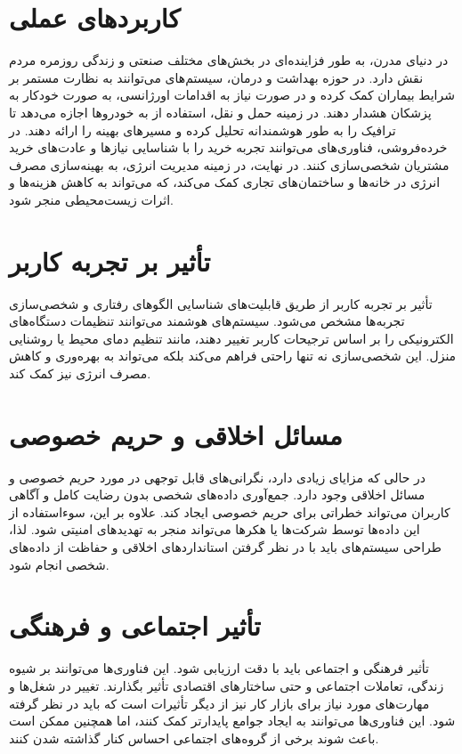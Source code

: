 \section*{کاربردهای عملی }
در دنیای مدرن،
به طور فزاینده‌ای در بخش‌های مختلف صنعتی و زندگی روزمره مردم نقش دارد. در حوزه بهداشت و درمان، سیستم‌های 
می‌توانند به نظارت مستمر بر شرایط بیماران کمک کرده و در صورت نیاز به اقدامات اورژانسی، به صورت خودکار به پزشکان هشدار دهند. در زمینه حمل و نقل، استفاده از
به خودروها اجازه می‌دهد تا ترافیک را به طور هوشمندانه تحلیل کرده و مسیرهای بهینه را ارائه دهند. در خرده‌فروشی، فناوری‌های
می‌توانند تجربه خرید را با شناسایی نیازها و عادت‌های خرید مشتریان شخصی‌سازی کنند. در نهایت، در زمینه مدیریت انرژی،
به بهینه‌سازی مصرف انرژی در خانه‌ها و ساختمان‌های تجاری کمک می‌کند، که می‌تواند به کاهش هزینه‌ها و اثرات زیست‌محیطی منجر شود.

\section*{تأثیر  بر تجربه کاربر}
تأثیر  بر تجربه کاربر از طریق قابلیت‌های شناسایی الگوهای رفتاری و شخصی‌سازی تجربه‌ها مشخص می‌شود. سیستم‌های هوشمند می‌توانند تنظیمات دستگاه‌های الکترونیکی را بر اساس ترجیحات کاربر تغییر دهند، مانند تنظیم دمای محیط یا روشنایی منزل. این شخصی‌سازی نه تنها راحتی فراهم می‌کند بلکه می‌تواند به بهره‌وری و کاهش مصرف انرژی نیز کمک کند.

\section*{مسائل اخلاقی و حریم خصوصی}
در حالی که  مزایای زیادی دارد، نگرانی‌های قابل توجهی در مورد حریم خصوصی و مسائل اخلاقی وجود دارد. جمع‌آوری داده‌های شخصی بدون رضایت کامل و آگاهی کاربران می‌تواند خطراتی برای حریم خصوصی ایجاد کند. علاوه بر این، سوءاستفاده از این داده‌ها توسط شرکت‌ها یا هکرها می‌تواند منجر به تهدیدهای امنیتی شود. لذا، طراحی سیستم‌های  باید با در نظر گرفتن استانداردهای اخلاقی و حفاظت از داده‌های شخصی انجام شود.

\section*{تأثیر اجتماعی و فرهنگی}
تأثیر فرهنگی و اجتماعی  باید با دقت ارزیابی شود. این فناوری‌ها می‌توانند بر شیوه زندگی، تعاملات اجتماعی و حتی ساختارهای اقتصادی تأثیر بگذارند. تغییر در شغل‌ها و مهارت‌های مورد نیاز برای بازار کار نیز از دیگر تأثیرات است که باید در نظر گرفته شود. این فناوری‌ها می‌توانند به ایجاد جوامع پایدارتر کمک کنند، اما همچنین ممکن است باعث شوند برخی از گروه‌های اجتماعی احساس کنار گذاشته شدن کنند.
